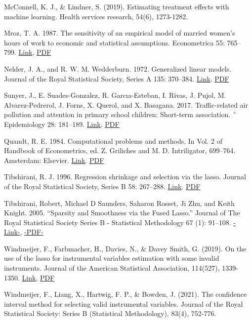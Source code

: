 {McConnell, K. J., \& Lindner, S. (2019). Estimating treatment effects with machine learning. Health services research, 54(6), 1273-1282.

Mroz, T. A. 1987. The sensitivity of an empirical model of married women’s hours of work to economic and statistical
assumptions. Econometrica 55: 765–799. \href{https://doi.org/10.2307/1911029}{Link}, \href{http://sci-hub.ren/10.2307/1911029}{PDF}


Nelder, J. A., and R. W. M. Wedderburn. 1972. Generalized linear models. Journal of the Royal Statistical Society,
Series A 135: 370–384. \href{https://doi.org/10.2307/2344614}{Link}. \href{http://sci-hub.ren/10.2307/2344614}{PDF}

Sunyer, J., E. Suades-Gonzalez, R. Garcıa-Esteban, I. Rivas, J. Pujol, M. Alvarez-Pedrerol, J. Forns, X. Querol, and
X. Basagana. 2017. Traffic-related air pollution and attention in primary school children: Short-term association. ˜
Epidemiology 28: 181–189. \href{https://doi.org/10.1097/EDE.0000000000000603}{Link}.
\href{http://sci-hub.ren/10.1097/EDE.0000000000000603}{PDF}

Quandt, R. E. 1984. Computational problems and methods. In Vol. 2 of Handbook of Econometrics, ed. Z. Griliches
and M. D. Intriligator, 699–764. Amsterdam: Elsevier. \href{https://doi.org/10.1016/S1573-4412(83)01016-8}{Link}. \href{http://sci-hub.ren/10.1016/S1573-4412(83)01016-8}{PDF}

Tibshirani, R. J. 1996. Regression shrinkage and selection via the lasso. Journal of the Royal Statistical Society,
Series B 58: 267–288. \href{https://doi.org/10.1111/j.2517-6161.1996.tb02080.x}{Link}. \href{http://sci-hub.ren/10.1111/j.2517-6161.1996.tb02080.x}{PDF}

Tibshirani, Robert, Michael D Saunders, Saharon Rosset, Ji Zhu, and Keith Knight. 2005. “Sparsity and Smoothness via the Fused Lasso.” Journal of The Royal Statistical Society Series B - Statistical Methodology 67 (1): 91–108. \href{https://doi.org/10.1111/J.1467-9868.2005.00490.X}{-Link-}, \href{http://sci-hub.ren/10.1111/J.1467-9868.2005.00490.X}{-PDF-}

Windmeijer, F., Farbmacher, H., Davies, N., \& Davey Smith, G. (2019). On the use of the lasso for instrumental variables estimation with some invalid instruments. Journal of the American Statistical Association, 114(527), 1339-1350. \href{https://doi.org/10.1080/01621459.2018.1498346}{Link}, \href{http://sci-hub.ren/10.1080/01621459.2018.1498346}{PDF}

Windmeijer, F., Liang, X., Hartwig, F. P., \& Bowden, J. (2021). The confidence interval method for selecting valid instrumental variables. Journal of the Royal Statistical Society: Series B (Statistical Methodology), 83(4), 752-776.


}
